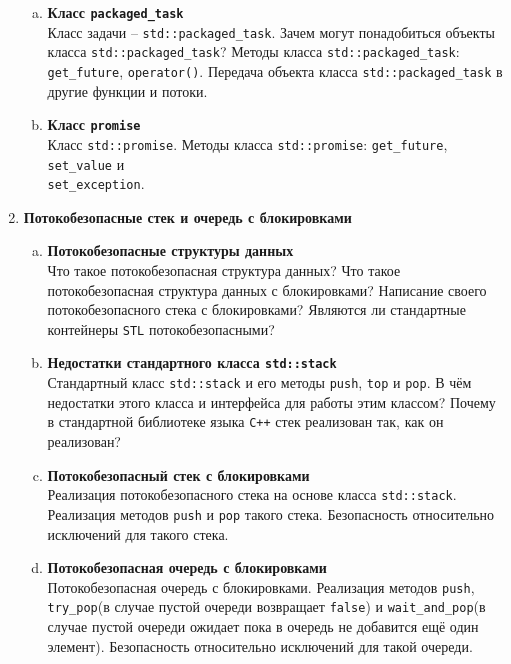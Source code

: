 \documentclass{article}
\begin{document}
\begin{enumerate}
\begin{enumerate}[a.]
\item \textbf{Класс \texttt{packaged\_task}}\\
Класс задачи -- \texttt{std::packaged\_task}. Зачем могут понадобиться объекты класса \texttt{std::packaged\_task}? Методы класса \texttt{std::packaged\_task}: \texttt{get\_future}, \texttt{operator()}. Передача объекта класса \texttt{std::packaged\_task} в другие функции и потоки.


\item \textbf{Класс \texttt{promise}}\\
Класс \texttt{std::promise}. Методы класса \texttt{std::promise}: \texttt{get\_future}, \texttt{set\_value} и\\ \texttt{set\_exception}.
\end{enumerate}


\item \textbf{Потокобезопасные стек и очередь с блокировками}
\begin{enumerate}[a.]
\item \textbf{Потокобезопасные структуры данных}\\
Что такое потокобезопасная структура данных? Что такое потокобезопасная структура данных с блокировками? Написание своего потокобезопасного стека с блокировками? Являются ли стандартные контейнеры \texttt{STL} потокобезопасными?

\item \textbf{Недостатки стандартного класса \texttt{std::stack}}\\
Стандартный класс \texttt{std::stack} и его методы \texttt{push}, \texttt{top} и \texttt{pop}. В чём недостатки этого класса и интерфейса для работы этим классом? Почему в стандартной библиотеке языка \texttt{C++} стек реализован так, как он реализован?

\item \textbf{Потокобезопасный стек с блокировками}\\
Реализация потокобезопасного стека на основе класса \texttt{std::stack}. Реализация методов \texttt{push} и \texttt{pop} такого стека. Безопасность относительно исключений для такого стека.

\item \textbf{Потокобезопасная очередь с блокировками}\\
Потокобезопасная очередь с блокировками. Реализация методов \texttt{push}, \texttt{try\_pop}(в случае пустой очереди возвращает \texttt{false}) и \texttt{wait\_and\_pop}(в случае пустой очереди ожидает пока в очередь не добавится ещё один элемент). Безопасность относительно исключений для такой очереди.


\end{enumerate}
\end{enumerate}
\end{document}
